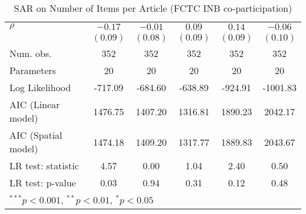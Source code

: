 \begin{table}[!h]
\begin{center}
\begin{tabular}{l c c c c c }
$\rho$                  & $-0.17$      & $-0.01$      & $0.09$       & $0.14$       & $-0.06$      \\
                        & $(0.09)$     & $(0.08)$     & $(0.09)$     & $(0.09)$     & $(0.10)$     \\
\midrule
Num. obs.               & 352          & 352          & 352          & 352          & 352          \\
Parameters              & 20           & 20           & 20           & 20           & 20           \\
Log Likelihood          & -717.09      & -684.60      & -638.89      & -924.91      & -1001.83     \\
AIC (Linear model)      & 1476.75      & 1407.20      & 1316.81      & 1890.23      & 2042.17      \\
AIC (Spatial model)     & 1474.18      & 1409.20      & 1317.77      & 1889.83      & 2043.67      \\
LR test: statistic      & 4.57         & 0.00         & 1.04         & 2.40         & 0.50         \\
LR test: p-value        & 0.03         & 0.94         & 0.31         & 0.12         & 0.48         \\
\bottomrule
\multicolumn{6}{l}{\scriptsize{$^{***}p<0.001$, $^{**}p<0.01$, $^*p<0.05$}}
\end{tabular}
\caption{SAR on Number of Items per Article (FCTC INB co-participation)}
\label{table:coefficients}
\end{center}
\end{table}
